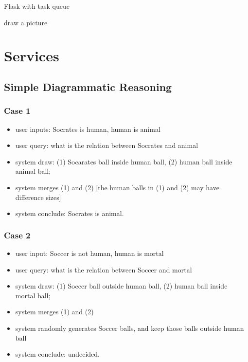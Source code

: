 \documentclass[runningheads]{llncs}
\begin{document}
Flask with task queue 

draw a picture

\section{Services}

\subsection{Simple Diagrammatic Reasoning}
\subsubsection{Case 1}
\begin{itemize}
	\item user inputs: Socrates is human, human is animal
	\item  user query: what is the relation between Socrates and animal
	\item  system draw: (1) Socarates ball inside human ball, (2) human ball inside animal ball; 
	\item system merges (1) and (2) [the human balls in (1) and (2) may have difference sizes]
	\item system conclude: Socrates is animal.
\end{itemize}

\subsubsection{Case 2}
\begin{itemize}
	\item user input: Soccer is not human, human is mortal
	\item  user query: what is the relation between Soccer and mortal
	\item  system draw: (1) Soccer ball outside human ball, (2) human ball inside mortal ball; 
	\item system merges (1) and (2) 
	\item system randomly generates Soccer balls, and keep those balls outside human ball
	\item system conclude: undecided.
\end{itemize}
 
\end{document}
